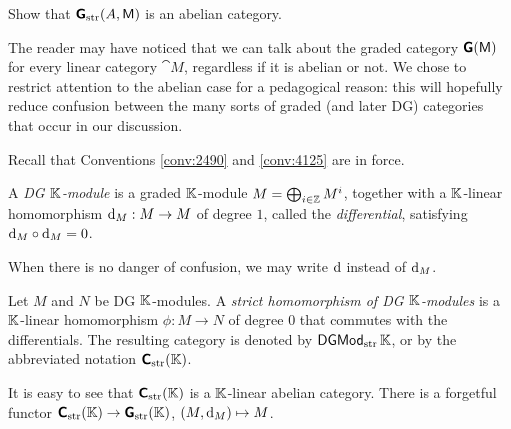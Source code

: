 \begin{exer} \label{exer:1705}
Show that $\boldsymbol{\mathsf{G}}_{\mathrm{str}}(A, \operatorname{\mathsf{M}})$ is an abelian category. 
\end{exer}

\begin{rem} \label{rem:2517}
The reader may have noticed that we can talk about the graded category 
$\boldsymbol{\mathsf{G}}(\operatorname{\mathsf{M}})$ for every linear category $\cat{M}$, regardless if it 
is abelian or not. We chose to restrict attention to the abelian case for a 
pedagogical reason: this will hopefully reduce confusion between the many sorts 
of graded (and later DG) categories that occur in our discussion. 
\end{rem}




Recall that Conventions \ref{conv:2490} and \ref{conv:4125} are in force. 

\begin{dfn} \label{dfn:1070}
A {\em DG $\mathbb{K}$-module}%
 is a graded $\mathbb{K}$-module 
$M = \bigoplus_{i \in \mathbb{Z}} M^i$, together with a $\mathbb{K}$-linear homomorphism 
$\mathrm{d}_M : M \to M$ of degree $1$, called the {\em differential}, satisfying 
$\mathrm{d}_M \circ \mathrm{d}_M = 0$.
\end{dfn}

When there is no danger of confusion, we may write $\mathrm{d}$ instead of $\mathrm{d}_M$. 

\begin{dfn} \label{dfn:1084}
Let $M$ and $N$ be DG $\mathbb{K}$-modules. A 
{\em strict homomorphism of DG $\mathbb{K}$-modules}%
is a $\mathbb{K}$-linear homomorphism $\phi : M \to N$ 
of degree $0$ that commutes with the differentials. 
The resulting category is denoted by $\operatorname{\mathsf{DGMod}}_{\mathrm{str}} \mathbb{K}$, or by the 
abbreviated notation $\boldsymbol{\mathsf{C}}_{\mathrm{str}}(\mathbb{K})$. 
\end{dfn}

It is easy to see that $\boldsymbol{\mathsf{C}}_{\mathrm{str}}(\mathbb{K})$ is a $\mathbb{K}$-linear abelian 
category. There is a forgetful functor 
$\boldsymbol{\mathsf{C}}_{\mathrm{str}}(\mathbb{K}) \to \boldsymbol{\mathsf{G}}_{\mathrm{str}}(\mathbb{K})$, 
$(M, \mathrm{d}_M) \mapsto M$.

